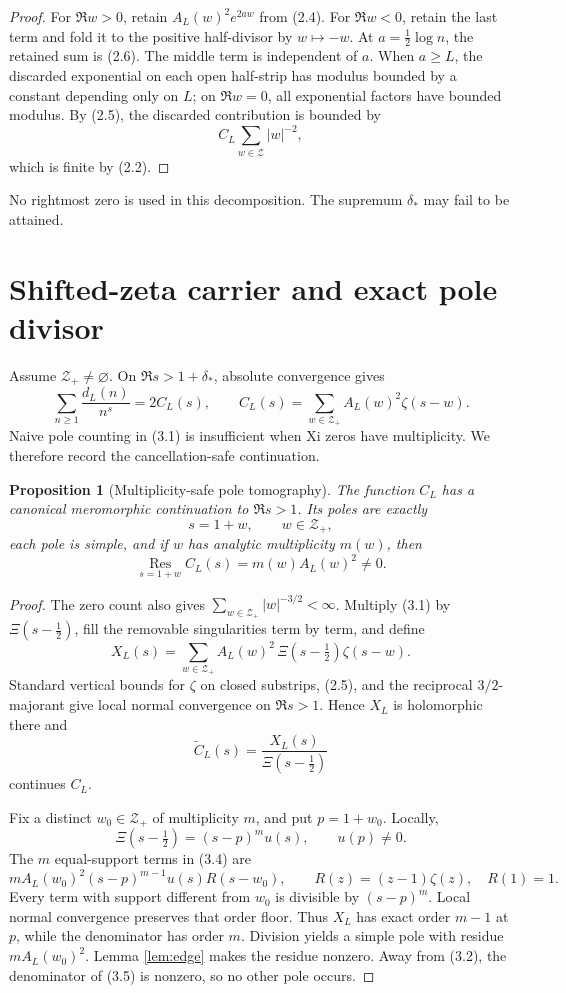 \documentclass[11pt]{article}
\newtheorem{proposition}[theorem]{Proposition}
\newcommand{\cZ}{\mathcal Z}
\newcommand{\Res}{\operatorname*{Res}}
\begin{document}
\begin{proof}
For \(\Re w>0\), retain \(A_L(w)^2e^{2aw}\) from (2.4).  For \(\Re w<0\), retain the last
term and fold it to the positive half-divisor by \(w\mapsto-w\).  At
\(a=\frac12\log n\), the retained sum is (2.6).  The middle term is independent of \(a\).
When \(a\ge L\), the discarded exponential on each open half-strip has modulus bounded by a
constant depending only on \(L\); on \(\Re w=0\), all exponential factors have bounded modulus.
By (2.5), the discarded contribution is bounded by
\[
 C_L\sum_{w\in\cZ}|w|^{-2},
\]
which is finite by (2.2).
\end{proof}

No rightmost zero is used in this decomposition.  The supremum \(\delta_*\) may fail to be
attained.

\section{Shifted-zeta carrier and exact pole divisor}\label{sec:carrier}

Assume \(\cZ_+\ne\varnothing\).  On \(\Re s>1+\delta_*\), absolute convergence gives
\[
 \sum_{n\ge1}\frac{d_L(n)}{n^s}
 =2C_L(s),
 \qquad
 C_L(s)=\sum_{w\in\cZ_+}A_L(w)^2\zeta(s-w).
\tag{3.1}
\]
Naive pole counting in (3.1) is insufficient when Xi zeros have multiplicity.  We therefore
record the cancellation-safe continuation.

\begin{proposition}[Multiplicity-safe pole tomography]\label{prop:poles}
The function \(C_L\) has a canonical meromorphic continuation to \(\Re s>1\).  Its poles are
exactly
\[
 s=1+w,\qquad w\in\cZ_+,
\tag{3.2}
\]
each pole is simple, and if \(w\) has analytic multiplicity \(m(w)\), then
\[
 \Res_{s=1+w}C_L(s)=m(w)A_L(w)^2\ne0.
\tag{3.3}
\]
\end{proposition}

\begin{proof}
The zero count also gives \(\sum_{w\in\cZ_+}|w|^{-3/2}<\infty\).  Multiply (3.1) by
\(\Xi(s-\frac12)\), fill the removable singularities term by term, and define
\[
 X_L(s)=\sum_{w\in\cZ_+}
 A_L(w)^2\,\Xi(s-\tfrac12)\zeta(s-w).
\tag{3.4}
\]
Standard vertical bounds for \(\zeta\) on closed substrips, (2.5), and the reciprocal
\(3/2\)-majorant give local normal convergence on \(\Re s>1\).  Hence \(X_L\) is holomorphic
there and
\[
 \widetilde C_L(s)=\frac{X_L(s)}{\Xi(s-\frac12)}
\tag{3.5}
\]
continues \(C_L\).

Fix a distinct \(w_0\in\cZ_+\) of multiplicity \(m\), and put \(p=1+w_0\).  Locally,
\[
 \Xi(s-\tfrac12)=(s-p)^m u(s),\qquad u(p)\ne0.
\tag{3.6}
\]
The \(m\) equal-support terms in (3.4) are
\[
 mA_L(w_0)^2(s-p)^{m-1}u(s)R(s-w_0),
\qquad
 R(z)=(z-1)\zeta(z),\quad R(1)=1.
\tag{3.7}
\]
Every term with support different from \(w_0\) is divisible by \((s-p)^m\).
Local normal convergence preserves that order floor.  Thus \(X_L\) has exact order \(m-1\) at
\(p\), while the denominator has order \(m\).  Division yields a simple pole with residue
\(mA_L(w_0)^2\).  Lemma \ref{lem:edge} makes the residue nonzero.  Away from (3.2), the
denominator of (3.5) is nonzero, so no other pole occurs.
\end{proof}
\end{document}
